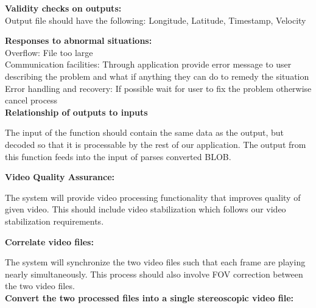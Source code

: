 \documentclass[10pt,draftclsnofoot,onecolumn]{IEEEtran}
\begin{document}
\textbf{Validity checks on outputs: }\\
 \vspace{5mm}
Output file should have the following: Longitude, Latitude, Timestamp, Velocity

 \vspace{5mm}

\textbf{Responses to abnormal situations:}\\
 \vspace{5mm}
 Overflow: File too large\\
 Communication facilities: Through application provide error message to user describing the problem and what if anything they can do to remedy the situation \\
 Error handling and recovery: If possible wait for user to fix the problem otherwise cancel process\\

 \vspace{5mm}
\textbf{Relationship of outputs to inputs }\\
 \vspace{2mm}

The input of the function should contain the same data as the output, but decoded so that it is processable by the rest of our application. The output from this function feeds into the input of parses converted BLOB. \\
\vspace{5mm}

\textbf{Video Quality Assurance: }\\
 \vspace{5mm}

The system will provide video processing functionality that improves quality of given video. This should include video stabilization which follows our video stabilization requirements. \\
\vspace{5mm}

\textbf{Correlate video files: }\\
 \vspace{5mm}

The system will synchronize the two video files such that each frame are playing nearly simultaneously. This process should also involve FOV correction between the two video files. \\
\vspace{5mm}
\textbf{Convert the two processed files into a single stereoscopic video file: }\\
 \vspace{5mm}
\end{document}
